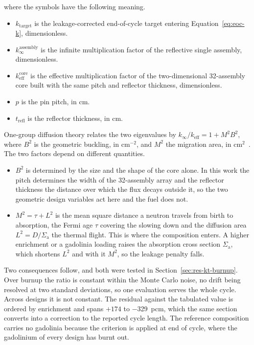 \noindent where the symbols have the following meaning.

\begin{itemize}
  \item $k_\mathrm{target}$ is the leakage-corrected end-of-cycle
        target entering Equation~\eqref{eq:eoc-k}, dimensionless.

  \item $k_\infty^\mathrm{assembly}$ is the infinite multiplication
        factor of the reflective single assembly, dimensionless.

  \item $k_\mathrm{eff}^\mathrm{core}$ is the effective multiplication
        factor of the two-dimensional 32-assembly core built with the
        same pitch and reflector thickness, dimensionless.

  \item $p$ is the pin pitch, in cm.

  \item $t_\mathrm{refl}$ is the reflector thickness, in cm.
\end{itemize}

One-group diffusion theory relates the two eigenvalues by
$k_\infty / k_\mathrm{eff} = 1 + M^2 B^2$, where $B^2$ is the geometric
buckling, in cm$^{-2}$, and $M^2$ the migration
area, in cm$^2$~\cite{duderstadt_hamilton_1976}. The two factors
depend on different quantities.

\begin{itemize}
  \item $B^2$ is determined by the size and the shape of the core
        alone. In this work the pitch determines the width of the
        32-assembly array and the reflector thickness the distance over
        which the flux decays outside it, so the two geometric design
        variables act here and the fuel does not.

  \item $M^2 = \tau + L^2$ is the mean square distance a neutron
        travels from birth to absorption, the Fermi age $\tau$ covering
        the slowing down and the diffusion area
        $L^2 = D / \Sigma_\mathrm{a}$ the thermal flight. This is where
        the composition enters. A higher enrichment or a gadolinia
        loading raises the absorption cross section
        $\Sigma_\mathrm{a}$, which shortens $L^2$ and with it $M^2$, so
        the leakage penalty falls.
\end{itemize}

Two consequences follow, and both were tested in
Section~\ref{sec:res-kt-burnup}. Over burnup the ratio is constant
within the Monte Carlo noise, no drift being resolved at two standard
deviations, so one evaluation serves the whole cycle. Across designs it
is not constant. The residual against the tabulated value is ordered by
enrichment and spans $+174$ to \SI{-329}{pcm}, which the same section
converts into a correction to the reported cycle length. The reference
composition carries no gadolinia because the criterion is applied at
end of cycle, where the gadolinium of every design has burnt out.

